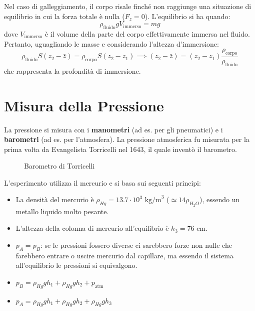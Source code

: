 Nel caso di galleggiamento, il corpo risale finché non raggiunge una situazione di equilibrio in cui la forza totale è nulla ($F_z = 0$). L'equilibrio si ha quando:
\begin{equation}
\rho_{\text{fluido}} g V_{\text{immerso}} = mg
\end{equation}
dove $V_{\text{immerso}}$ è il volume della parte del corpo effettivamente immersa nel fluido. Pertanto, uguagliando le masse e considerando l'altezza d'immersione:
\begin{equation}
\rho_{\text{fluido}} S (z_2 - \bar{z}) = \rho_{\text{corpo}} S (z_2 - z_1) \implies \boxed{(z_2 - \bar{z}) = (z_2 - z_1) \frac{\rho_{\text{corpo}}}{\rho_{\text{fluido}}}}
\end{equation}
che rappresenta la profondità di immersione.

\section{Misura della Pressione}
La pressione si misura con i \textbf{manometri} (ad es. per gli pneumatici) e i \textbf{barometri} (ad es. per l'atmosfera).
La pressione atmosferica fu misurata per la prima volta da Evangelista Torricelli nel 1643, il quale inventò il barometro.

\begin{figure}[ht]
    \centering
    \caption{Barometro di Torricelli}
\end{figure}

\medskip
L'esperimento utilizza il mercurio e si basa sui seguenti principi:
\begin{itemize}
    \item La densità del mercurio è $\rho_{Hg} = 13.7 \cdot 10^3 \text{ kg/m}^3$ ($\simeq 14 \rho_{H_2O}$), essendo un metallo liquido molto pesante.
    \item L'altezza della colonna di mercurio all'equilibrio è $h_3 = 76 \text{ cm}$.
    \item $p_A = p_B$: se le pressioni fossero diverse ci sarebbero forze non nulle che farebbero entrare o uscire mercurio dal capillare, ma essendo il sistema all'equilibrio le pressioni si equivalgono.
    \item $p_B = \rho_{Hg} g h_1 + \rho_{Hg} g h_2 + p_{\text{atm}}$
    \item $p_A = \rho_{Hg} g h_1 + \rho_{Hg} g h_2 + \rho_{Hg} g h_3$
\end{itemize}

